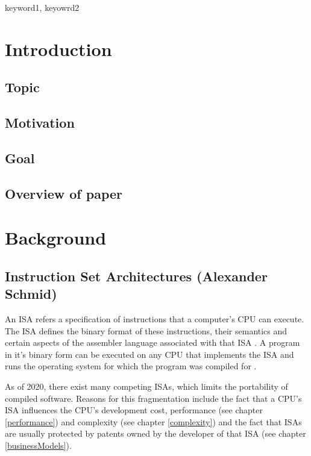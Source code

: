 \documentclass[conference]{IEEEtran}
\begin{document}
\begin{IEEEkeywords}
keyword1, keyowrd2
\end{IEEEkeywords}

\section{Introduction}
\label{ref:introduction}
	\subsection{Topic}
	\subsection{Motivation}
	\subsection{Goal}
	\subsection{Overview of paper}

\section{Background}
\label{ref:background}
	\subsection{Instruction Set Architectures (Alexander Schmid)}
	An \gls{ISA} refers a specification of instructions that a computer's \gls{CPU} can execute.
	The \gls{ISA} defines the binary format of these instructions, their semantics and certain aspects of the assembler
	language associated with that \gls{ISA} \cite[page 20-23]{Stokes2006}.
	A program in it's binary form can be executed on any \gls{CPU} that implements the \gls{ISA} and runs the operating system
	for which the program was compiled for \cite[page 71]{Stokes2006}.

	As of 2020, there exist many competing \glspl{ISA}, which limits the portability of compiled software.
	Reasons for this fragmentation include the fact that a \gls{CPU}'s \gls{ISA} influences the \gls{CPU}'s development cost, performance (see chapter \ref{performance})
	and complexity (see chapter \ref{complexity}) and the fact that \glspl{ISA} are usually protected by patents owned by the developer of that \gls{ISA} (see chapter \ref{businessModels}).
\end{document}
